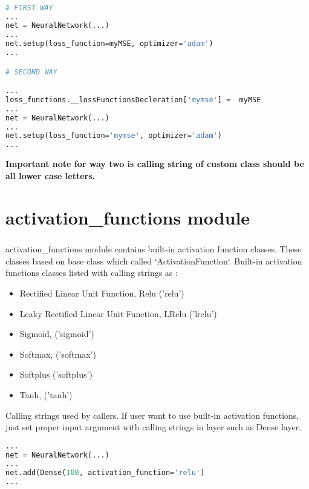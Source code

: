 \documentclass[12pt]{report}
\begin{document}
\begin{lstlisting}[language=Python, numbers=none, caption={Calling custom loss function class.}, label={lis:loss-calling-custom-class}]

# FIRST WAY
...
net = NeuralNetwork(...)
...
net.setup(loss_function=myMSE, optimizer='adam')
...

# SECOND WAY

...
loss_functions.__lossFunctionsDecleration['mymse'] =  myMSE
...
net = NeuralNetwork(...)
...
net.setup(loss_function='mymse', optimizer='adam')
...

\end{lstlisting}

\textbf{Important note for way two is calling string of custom class should be all lower case letters. }




\chapter{activation\_functions module}

\paragraph{}
activation\_functions module contains built-in activation function classes. These classes based on base class which called `ActivationFunction`. Built-in activation functions classes listed with calling strings as : 

\begin{itemize}
	\item	Rectified Linear Unit Function, Relu ('relu')
	\item	Leaky Rectified Linear Unit Function, LRelu ('lrelu')
	\item	Sigmoid, ('sigmoid')
	\item	Softmax, ('softmax')
	\item	Softplus ('softplus')
	\item	Tanh, ('tanh')
\end{itemize}

Calling strings used by callers. If user want to use built-in activation functions, just set proper input argument with calling strings in layer such as Dense layer.

\begin{lstlisting}[language=Python, numbers=none, caption={Built-in activation function.}, 
label={lis:activation-built-in}]
...
net = NeuralNetwork(...)
...
net.add(Dense(100, activation_function='relu')
...
\end{lstlisting}
\end{document}
